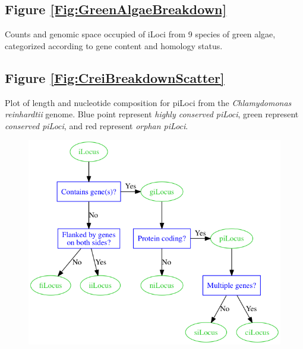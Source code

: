 \subsection*{Figure \ref{Fig:GreenAlgaeBreakdown}}

\noindent
Counts and genomic space occupied of iLoci from 9 species of green algae, categorized according to gene content and homology status.

\subsection*{Figure \ref{Fig:CreiBreakdownScatter}}

\noindent
Plot of length and nucleotide composition for piLoci from the \textit{Chlamydomonas reinhardtii} genome. Blue point represent \textit{highly conserved piLoci}, green represent \textit{conserved piLoci}, and red represent \textit{orphan piLoci}.

\begin{figure}[!bht]
\includegraphics[width=6in]{Assets/Graphics/iLoci/ilocus-designations.png}
\centering
\caption{~}
\label{Fig:iLocusDesignations}
\end{figure}

